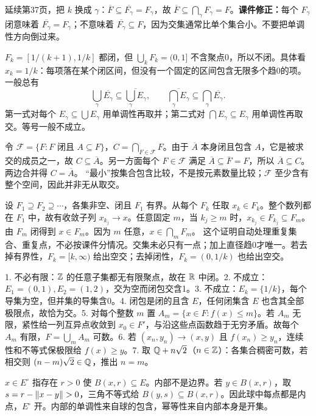 延续第37页，把 $k$ 换成 $\gamma$：$\overline F\subseteq\overline{F_\gamma}=F_\gamma$，故 $\overline F\subseteq\bigcap_\gamma F_\gamma=F$。\textbf{课件修正：}每个 $F_\gamma$ 闭意味着 $\overline{F_\gamma}=F_\gamma$；不意味着 $\overline{F_\gamma}\subseteq F$，因为交集通常比单个集合小。不要把单调性方向倒过来。

$F_k=[1/(k+1),1/k]$ 都闭，但 $\bigcup_kF_k=(0,1]$ 不含聚点0，所以不闭。具体看 $x_k=1/k$：每项落在某个闭区间，但没有一个固定的区间包含无限多个趋0的项。
一般总有
\[
 \bigcup_\gamma\overline{E_\gamma}\subseteq\overline{\bigcup_\gamma E_\gamma},
 \qquad \overline{\bigcap_\gamma E_\gamma}\subseteq\bigcap_\gamma\overline{E_\gamma}.
\]
第一式对每个 $E_\gamma\subseteq\bigcup E_\gamma$ 用单调性再取并；第二式对 $\bigcap E_\gamma\subseteq E_\gamma$ 用单调性再取交。等号一般不成立。

令 $\mathcal F=\{F:F\text{ 闭且 }A\subseteq F\}$，$C=\bigcap_{F\in\mathcal F}F$。由于 $\overline A$ 本身闭且包含 $A$，它是被求交的成员之一，故 $C\subseteq\overline A$。另一方面每个 $F\in\mathcal F$ 满足 $\overline A\subseteq\overline F=F$，所以 $\overline A\subseteq C$。两边合并得 $C=\overline A$。
``最小''按集合包含比较，不是按元素数量比较；$\mathcal F$ 至少含有整个空间，因此并非无从取交。

设 $F_1\supseteq F_2\supseteq\cdots$，各集非空、闭且 $F_1$ 有界。从每个 $F_k$ 任取 $x_k\in F_k$。整个数列都在 $F_1$ 中，故有收敛子列 $x_{k_j}\to x$。任意固定 $m$，当 $k_j\ge m$ 时，$x_{k_j}\in F_{k_j}\subseteq F_m$。由 $F_m$ 闭得到 $x\in F_m$。因为 $m$ 任意，$x\in\bigcap_mF_m$。
这个证明自动处理重复集合、重复点，不必按课件分情况。交集未必只有一点；加上直径趋0才唯一。若去掉有界性，$F_k=[k,\infty)$ 给出空交；去掉闭性，$F_k=(0,1/k)$ 也给出空交。

1. 不必有限：$\mathbb{Z}$ 的任意子集都无有限聚点，故在 $\mathbb{R}$ 中闭。2. 不成立：$E_1=(0,1),E_2=(1,2)$，交为空而闭包交含1。3. 不成立：$E_k=\{1/k\}$，每个导集为空，但并集的导集含0。4. 闭包是闭的且含 $E$，任何闭集含 $E$ 也含其全部极限点，故恰为交。5. 对每个整数 $m$ 置 $A_m=\{x\in F:f(x)\le m\}$。若 $A_m$ 无限，紧性给一列互异点收敛到 $x_0\in F'$，与沿这些点函数趋于无穷矛盾。故每个 $A_m$ 有限，$F=\bigcup_m A_m$ 可数。6. 若 $(x_n,y_n)\to(x,y)$ 且 $f(x_n)\ge y_n$，连续性和不等式保极限给 $f(x)\ge y$。7. 取 $\mathbb{Q}+n\sqrt2$（$n\in\mathbb{Z}$）：各集合稠密可数，若相交则 $(n-m)\sqrt2\in\mathbb{Q}$，推出 $n=m$。

$x\in E^\circ$ 指存在 $r>0$ 使 $B(x,r)\subseteq E$。内部不是边界。若 $y\in B(x,r)$，取 $s=r-\left\lVert x-y\right\rVert>0$，三角不等式给 $B(y,s)\subseteq B(x,r)$。因此球中每点都是内点，$E^\circ$ 开。内部的单调性来自球的包含，幂等性来自内部本身是开集。

